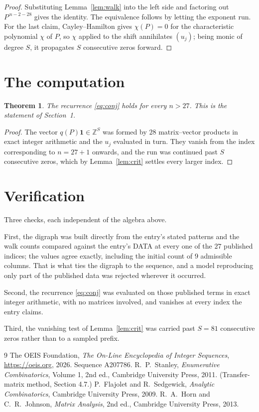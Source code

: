 \documentclass[11pt,a4paper]{article}
\theoremstyle{plain}
\newtheorem{theorem}{Theorem}
\theoremstyle{definition}
\begin{document}
\begin{proof}
Substituting Lemma~\ref{lem:walk} into the left side and factoring out
$P^{\,n-2-28}$ gives the identity. The equivalence follows by letting the exponent
run. For the last claim, Cayley--Hamilton gives $\chi(P)=0$ for the characteristic
polynomial $\chi$ of $P$, so $\chi$ applied to the shift annihilates $(u_j)$; being monic of
degree $S$, it propagates $S$ consecutive zeros forward.
\end{proof}

\section{The computation}

\begin{theorem}
The recurrence \eqref{eq:conj} holds for every $n>27$. This is the statement of
Section~1.
\end{theorem}

\begin{proof}
The vector $q(P)\mathbf{1}\in\mathbb{Z}^{S}$ was formed by $28$ matrix--vector
products in exact integer arithmetic and the $u_j$ evaluated in turn. They vanish from the
index corresponding to $n=27+1$ onwards, and the run was continued past $S$ consecutive
zeros, which by Lemma~\ref{lem:crit} settles every larger index.
\end{proof}

\section{Verification}

Three checks, each independent of the algebra above.

First, the digraph was built directly from the entry's stated patterns and the walk counts
compared against the entry's DATA at every one of the $27$ published indices; the
values agree exactly, including the initial count of $9$ admissible columns. That is
what ties the digraph to the sequence, and a model reproducing only part of the published
data was rejected wherever it occurred.

Second, the recurrence \eqref{eq:conj} was evaluated on those published terms in exact
integer arithmetic, with no matrices involved, and vanishes at every index the entry claims.

Third, the vanishing test of Lemma~\ref{lem:crit} was carried past $S=81$ consecutive
zeros rather than to a sampled prefix.

\begin{thebibliography}{9}
 The OEIS Foundation, \emph{The On-Line Encyclopedia of Integer
Sequences}, \url{https://oeis.org}, 2026. Sequence A207786.
 R.~P.~Stanley, \emph{Enumerative Combinatorics}, Volume 1, 2nd ed.,
Cambridge University Press, 2011. (Transfer-matrix method, Section 4.7.)
 P.~Flajolet and R.~Sedgewick, \emph{Analytic Combinatorics}, Cambridge
University Press, 2009.
 R.~A.~Horn and C.~R.~Johnson, \emph{Matrix Analysis}, 2nd ed., Cambridge
University Press, 2013.
\end{thebibliography}
\end{document}
